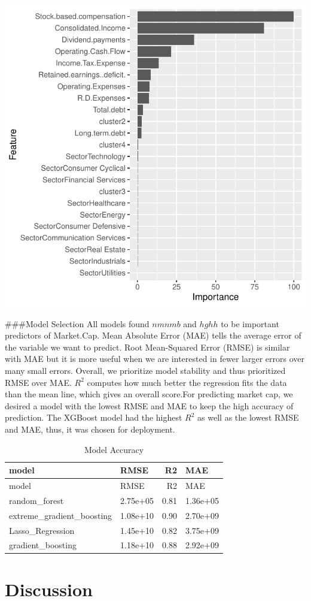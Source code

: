 \documentclass[11pt,]{article}
\begin{document}
\begin{center}\includegraphics{stock_analysis_files/figure-latex/gradient boosting-1} \end{center}

\#\#\#Model Selection All models found \(nmnmb\) and \(hghh\) to be
important predictors of Market.Cap. Mean Absolute Error (MAE) tells the
average error of the variable we want to predict. Root Mean-Squared
Error (RMSE) is similar with MAE but it is more useful when we are
interested in fewer larger errors over many small errors. Overall, we
prioritize model stability and thus prioritized RMSE over MAE. \(R^2\)
computes how much better the regression fits the data than the mean
line, which gives an overall score.For predicting market cap, we desired
a model with the lowest RMSE and MAE to keep the high accuracy of
prediction. The XGBoost model had the highest \(R^2\) as well as the
lowest RMSE and MAE, thus, it was chosen for deployment.

\begin{longtable}[]{@{}llrl@{}}
\caption{Model Accuracy}\tabularnewline
\toprule
model & RMSE & R2 & MAE\tabularnewline
\midrule
\endfirsthead
\toprule
model & RMSE & R2 & MAE\tabularnewline
\midrule
\endhead
random\_forest & 2.75e+05 & 0.81 & 1.36e+05\tabularnewline
extreme\_gradient\_boosting & 1.08e+10 & 0.90 & 2.70e+09\tabularnewline
Lasso\_Regression & 1.45e+10 & 0.82 & 3.75e+09\tabularnewline
gradient\_boosting & 1.18e+10 & 0.88 & 2.92e+09\tabularnewline
\bottomrule
\end{longtable}

\hypertarget{discussion}{%
\section{Discussion}\label{discussion}}





\newpage
\singlespacing 
\end{document}
